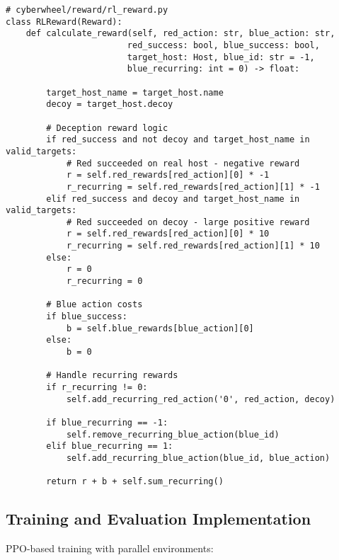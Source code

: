 \documentclass[12pt,a4paper]{article}
\begin{document}
\begin{lstlisting}[caption=Reward Function Implementation]
# cyberwheel/reward/rl_reward.py
class RLReward(Reward):
    def calculate_reward(self, red_action: str, blue_action: str,
                        red_success: bool, blue_success: bool,
                        target_host: Host, blue_id: str = -1,
                        blue_recurring: int = 0) -> float:
        
        target_host_name = target_host.name
        decoy = target_host.decoy
        
        # Deception reward logic
        if red_success and not decoy and target_host_name in valid_targets:
            # Red succeeded on real host - negative reward
            r = self.red_rewards[red_action][0] * -1
            r_recurring = self.red_rewards[red_action][1] * -1
        elif red_success and decoy and target_host_name in valid_targets:
            # Red succeeded on decoy - large positive reward
            r = self.red_rewards[red_action][0] * 10
            r_recurring = self.red_rewards[red_action][1] * 10
        else:
            r = 0
            r_recurring = 0
        
        # Blue action costs
        if blue_success:
            b = self.blue_rewards[blue_action][0]
        else:
            b = 0
        
        # Handle recurring rewards
        if r_recurring != 0:
            self.add_recurring_red_action('0', red_action, decoy)
        
        if blue_recurring == -1:
            self.remove_recurring_blue_action(blue_id)
        elif blue_recurring == 1:
            self.add_recurring_blue_action(blue_id, blue_action)
        
        return r + b + self.sum_recurring()
\end{lstlisting}

\subsection{Training and Evaluation Implementation}
PPO-based training with parallel environments:
\end{document}
